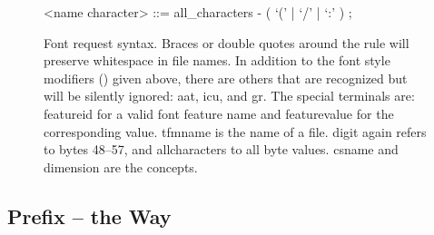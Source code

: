 \begin {figure} [b]
\begin{grammar}
      <name character>   ::= {\sc all_characters} - ( `(' | `/' | `:' ) ;
    \end{grammar}
  \endgroup
  \caption{Font request syntax.
           Braces or double quotes around the
            rule will
           preserve whitespace in file names.
           In addition to the font style modifiers
           () given above, there
           are others that are recognized but will be silently
           ignored: {\ttfamily aat},
                    {\ttfamily icu}, and
                    {\ttfamily gr}.
           The special terminals are:
           {\sc feature\textunderscore id} for a valid font
              feature name and
           {\sc feature\textunderscore value} for the corresponding
              value.
           {\sc tfmname} is the name of a  file.
           {\sc digit}  again refers to bytes 48--57, and
           {\sc all\textunderscore characters} to all byte values.
           {\sc csname} and {\sc dimension} are the \TEX concepts.}
  \label{font-syntax}
\end {figure}

\subsection{Prefix -- the Way}

